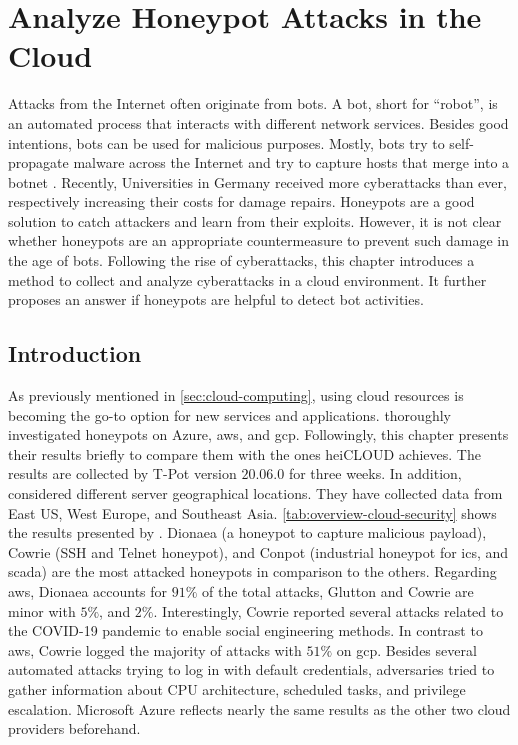\chapter{Analyze Honeypot Attacks in the Cloud}
\label{chap:cloud-security}

Attacks from the Internet often originate from bots.
A bot, short for \enquote{robot}, is an automated process that interacts with different network services.
Besides good intentions, bots can be used for malicious purposes.
Mostly, bots try to self-propagate malware across the Internet and try to capture hosts that merge into a botnet \cite{Feily2009}.
Recently, Universities in Germany received more cyberattacks than ever, respectively increasing their costs for damage repairs.
Honeypots are a good solution to catch attackers and learn from their exploits.
However, it is not clear whether honeypots are an appropriate countermeasure to prevent such damage in the age of bots.
Following the rise of cyberattacks, this chapter introduces a method to collect and analyze cyberattacks in a cloud environment.
It further proposes an answer if honeypots are helpful to detect bot activities.

\section{Introduction}

As previously mentioned in \autoref{sec:cloud-computing}, using cloud resources is becoming the go-to option for new services and applications.
\citet{Kelly2021} thoroughly investigated honeypots on Azure, \ac{aws}, and \ac{gcp}.
Followingly, this chapter presents their results briefly to compare them with the ones heiCLOUD achieves.
The results are collected by T-Pot version $20.06.0$ for three weeks.
In addition, \citet{Kelly2021} considered different server geographical locations.
They have collected data from East US, West Europe, and Southeast Asia.
\autoref{tab:overview-cloud-security} shows the results presented by \citet{Kelly2021}.
Dionaea (a honeypot to capture malicious payload), Cowrie (SSH and Telnet honeypot), and Conpot (industrial honeypot for \acs{ics}, and \acs{scada}) are the most attacked honeypots in comparison to the others.
Regarding \ac{aws}, Dionaea accounts for $91\%$ of the total attacks, Glutton and Cowrie are minor with $5\%$, and $2\%$.
Interestingly, Cowrie reported several attacks related to the COVID-19 pandemic to enable social engineering methods.
In contrast to \ac{aws}, Cowrie logged the majority of attacks with $51\%$ on \ac{gcp}.
Besides several automated attacks trying to log in with default credentials, adversaries tried to gather information about CPU architecture, scheduled tasks, and privilege escalation.
Microsoft Azure reflects nearly the same results as the other two cloud providers beforehand.

